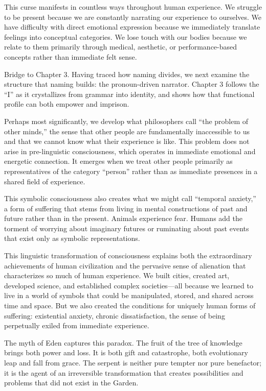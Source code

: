 This curse manifests in countless ways throughout human experience. We struggle to be present because we are constantly narrating our experience to ourselves. We have difficulty with direct emotional expression because we immediately translate feelings into conceptual categories. We lose touch with our bodies because we relate to them primarily through medical, aesthetic, or performance-based concepts rather than immediate felt sense.

\bigskip
\noindent Bridge to Chapter 3. Having traced how naming divides, we next examine the structure that naming builds: the pronoun-driven narrator. Chapter 3 follows the “I” as it crystallizes from grammar into identity, and shows how that functional profile can both empower and imprison.

Perhaps most significantly, we develop what philosophers call “the problem of other minds,” the sense that other people are fundamentally inaccessible to us and that we cannot know what their experience is like. This problem does not arise in pre-linguistic consciousness, which operates in immediate emotional and energetic connection. It emerges when we treat other people primarily as representatives of the category “person” rather than as immediate presences in a shared field of experience.

This symbolic consciousness also creates what we might call “temporal anxiety,” a form of suffering that stems from living in mental constructions of past and future rather than in the present. Animals experience fear. Humans add the torment of worrying about imaginary futures or ruminating about past events that exist only as symbolic representations.

This linguistic transformation of consciousness explains both the extraordinary achievements of human civilization and the pervasive sense of alienation that characterizes so much of human experience. We built cities, created art, developed science, and established complex societies—all because we learned to live in a world of symbols that could be manipulated, stored, and shared across time and space. But we also created the conditions for uniquely human forms of suffering: existential anxiety, chronic dissatisfaction, the sense of being perpetually exiled from immediate experience.

The myth of Eden captures this paradox. The fruit of the tree of knowledge brings both power and loss. It is both gift and catastrophe, both evolutionary leap and fall from grace. The serpent is neither pure tempter nor pure benefactor; it is the agent of an irreversible transformation that creates possibilities and problems that did not exist in the Garden.


